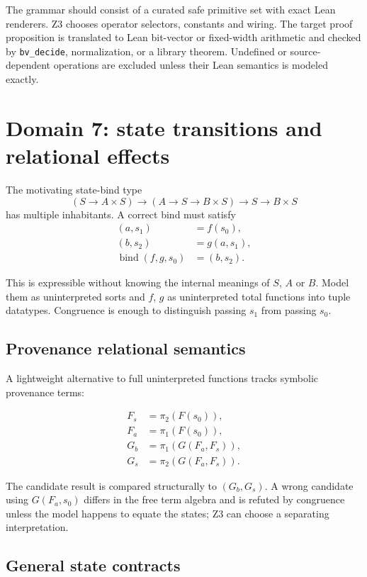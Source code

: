 \documentclass[11pt,oneside]{report}
\newcommand{\code}[1]{\texttt{#1}}
\begin{document}
The grammar should consist of a curated safe primitive set with exact Lean renderers. Z3 chooses operator selectors, constants and wiring. The target proof proposition is translated to Lean bit-vector or fixed-width arithmetic and checked by \code{bv\_decide}, normalization, or a library theorem. Undefined or source-dependent operations are excluded unless their Lean semantics is modeled exactly.

\section{Domain 7: state transitions and relational effects}
\label{sec:domain-state}

The motivating state-bind type
\[
(S\to A\times S)\to(A\to S\to B\times S)\to S\to B\times S
\]
has multiple inhabitants. A correct bind must satisfy
\[
\begin{aligned}
(a,s_1)&=f(s_0),\\
(b,s_2)&=g(a,s_1),\\
\operatorname{bind}(f,g,s_0)&=(b,s_2).
\end{aligned}
\]

This is expressible without knowing the internal meanings of $S$, $A$ or $B$. Model them as uninterpreted sorts and $f$, $g$ as uninterpreted total functions into tuple datatypes. Congruence is enough to distinguish passing $s_1$ from passing $s_0$.

\subsection{Provenance relational semantics}

A lightweight alternative to full uninterpreted functions tracks symbolic provenance terms:

\begin{align*}
F_s &= \pi_2(F(s_0)),\\
F_a &= \pi_1(F(s_0)),\\
G_b &= \pi_1(G(F_a,F_s)),\\
G_s &= \pi_2(G(F_a,F_s)).
\end{align*}

The candidate result is compared structurally to $(G_b,G_s)$. A wrong candidate using $G(F_a,s_0)$ differs in the free term algebra and is refuted by congruence unless the model happens to equate the states; Z3 can choose a separating interpretation.

\subsection{General state contracts}
\end{document}

